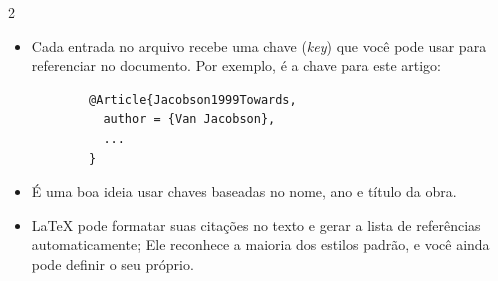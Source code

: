 \documentclass{beamer}
\begin{document}
\begin{frame}[fragile]{\insertsubsection{} 2}
	\begin{itemize}
		\item Cada entrada no arquivo  recebe uma chave (\emph{key}) que você pode usar para referenciar no documento. Por exemplo,  é a chave para este artigo:
		\begin{verbatim}
		@Article{Jacobson1999Towards,
		  author = {Van Jacobson},
		  ...
		}
		\end{verbatim}
		\item É uma boa ideia usar chaves baseadas no nome, ano e título da obra.
		\item \LaTeX{} pode formatar suas citações no texto e gerar a lista de referências automaticamente; Ele reconhece a maioria dos estilos padrão, e você ainda pode definir o seu próprio.
	\end{itemize}
\end{frame}
\end{document}
